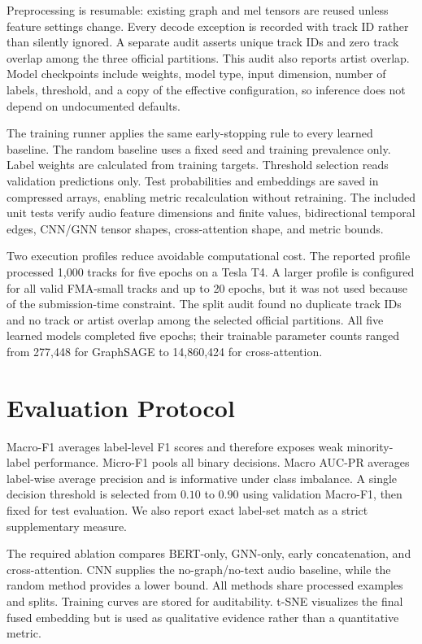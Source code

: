 \IfFileExists{IEEEtran.cls}{\usingieeetrue\documentclass[conference]{IEEEtran}}{\usingieeefalse\documentclass[10pt,twocolumn]{article}}
\begin{document}
Preprocessing is resumable: existing graph and mel tensors are reused unless feature settings change. Every decode exception is recorded with track ID rather than silently ignored. A separate audit asserts unique track IDs and zero track overlap among the three official partitions. This audit also reports artist overlap. Model checkpoints include weights, model type, input dimension, number of labels, threshold, and a copy of the effective configuration, so inference does not depend on undocumented defaults.

The training runner applies the same early-stopping rule to every learned baseline. The random baseline uses a fixed seed and training prevalence only. Label weights are calculated from training targets. Threshold selection reads validation predictions only. Test probabilities and embeddings are saved in compressed arrays, enabling metric recalculation without retraining. The included unit tests verify audio feature dimensions and finite values, bidirectional temporal edges, CNN/GNN tensor shapes, cross-attention shape, and metric bounds.

Two execution profiles reduce avoidable computational cost. The reported profile processed 1,000 tracks for five epochs on a Tesla T4. A larger profile is configured for all valid FMA-small tracks and up to 20 epochs, but it was not used because of the submission-time constraint. The split audit found no duplicate track IDs and no track or artist overlap among the selected official partitions. All five learned models completed five epochs; their trainable parameter counts ranged from 277,448 for GraphSAGE to 14,860,424 for cross-attention.

\section{Evaluation Protocol}
Macro-F1 averages label-level F1 scores and therefore exposes weak minority-label performance. Micro-F1 pools all binary decisions. Macro AUC-PR averages label-wise average precision and is informative under class imbalance. A single decision threshold is selected from $0.10$ to $0.90$ using validation Macro-F1, then fixed for test evaluation. We also report exact label-set match as a strict supplementary measure.

The required ablation compares BERT-only, GNN-only, early concatenation, and cross-attention. CNN supplies the no-graph/no-text audio baseline, while the random method provides a lower bound. All methods share processed examples and splits. Training curves are stored for auditability. t-SNE \cite{vandermaaten2008tsne} visualizes the final fused embedding but is used as qualitative evidence rather than a quantitative metric.
\end{document}
